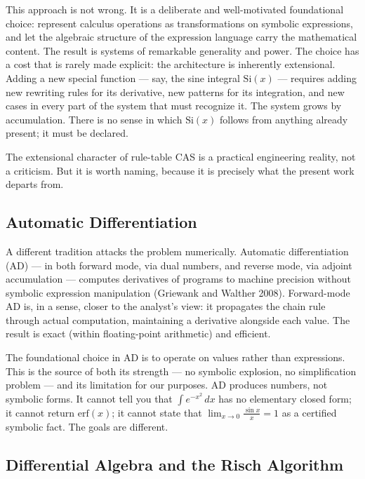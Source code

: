 \documentclass[12pt]{article}
\begin{document}
This approach is not wrong. It is a deliberate and well-motivated
foundational choice: represent calculus operations as transformations on
symbolic expressions, and let the algebraic structure of the expression
language carry the mathematical content. The result is systems of
remarkable generality and power. The choice has a cost that is rarely
made explicit: the architecture is inherently extensional. Adding a new
special function --- say, the sine integral \(\mathrm{Si}(x)\) ---
requires adding new rewriting rules for its derivative, new patterns for
its integration, and new cases in every part of the system that must
recognize it. The system grows by accumulation. There is no sense in
which \(\mathrm{Si}(x)\) follows from anything already present; it must
be declared.

The extensional character of rule-table CAS is a practical engineering
reality, not a criticism. But it is worth naming, because it is
precisely what the present work departs from.


\subsection{Automatic
Differentiation}\label{automatic-differentiation}

A different tradition attacks the problem numerically. Automatic
differentiation (AD) --- in both forward mode, via dual numbers, and
reverse mode, via adjoint accumulation --- computes derivatives of
programs to machine precision without symbolic expression manipulation
(Griewank and Walther 2008). Forward-mode AD is, in a sense, closer to
the analyst's view: it propagates the chain rule through actual
computation, maintaining a derivative alongside each value. The result
is exact (within floating-point arithmetic) and efficient.

The foundational choice in AD is to operate on values rather than
expressions. This is the source of both its strength --- no symbolic
explosion, no simplification problem --- and its limitation for our
purposes. AD produces numbers, not symbolic forms. It cannot tell you
that \(\int e^{-x^2}\,dx\) has no elementary closed form; it cannot
return \(\mathrm{erf}(x)\); it cannot state that
\(\lim_{x \to 0} \frac{\sin x}{x} = 1\) as a certified symbolic fact.
The goals are different.


\subsection{Differential Algebra and the Risch
Algorithm}\label{differential-algebra-and-the-risch-algorithm}
\end{document}
